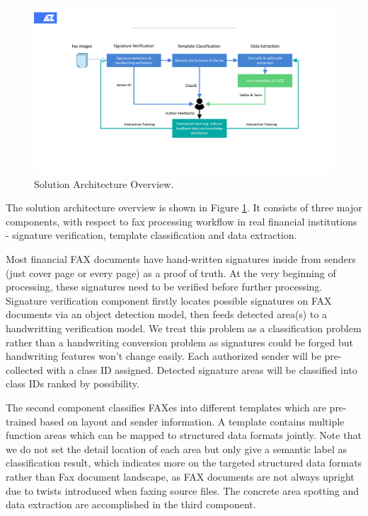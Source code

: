 \documentclass[sigconf]{acmart}
\begin{document}
\begin{figure}[h]
	\centering
	\includegraphics[width=\linewidth]{figure1}
	\caption{Solution Architecture Overview. }
	\label{figure1}
\end{figure}

The solution architecture overview is shown in Figure \ref{figure1}. It consists of three major components, with respect to fax processing workflow in real financial institutions - signature verification, template classification and data extraction.

Most financial FAX documents have hand-written signatures inside from senders (just cover page or every page) as a proof of truth. At the very beginning of processing, these signatures need to be verified before further processing. Signature verification component firstly locates possible signatures on FAX documents via an object detection model, then feeds detected area(s) to a handwritting verification model. We treat this problem as a classification problem rather than a handwriting conversion problem as signatures could be forged but handwriting features won't change easily. Each authorized sender will be pre-collected with a class ID assigned. Detected signature areas will be classified into class IDs ranked by possibility. 

The second component classifies FAXes into different templates which are pre-trained based on layout and sender information. A template contains multiple function areas which can be mapped to structured data formats jointly. Note that we do not set the detail location of each area but only give a semantic label as classification result, which indicates more on the targeted structured data formats rather than Fax document landscape, as FAX documents are not always upright due to twists introduced when faxing source files. The concrete area spotting and data extraction are accomplished in the third component.
\end{document}

